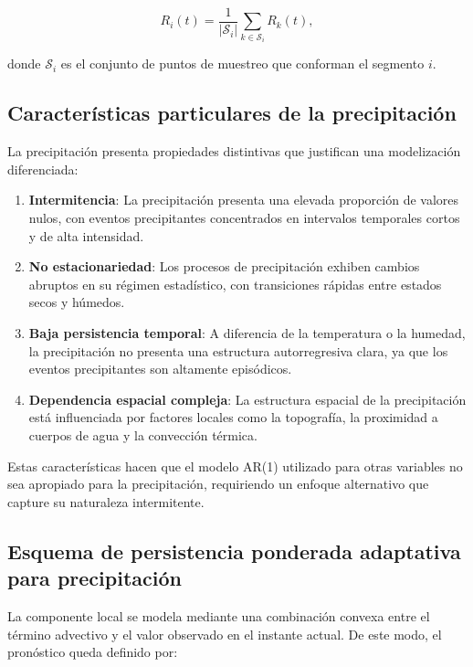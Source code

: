 \documentclass[
  spanish,
  us-letterpaper,
]{scrreprt}
\numberwithin{equation}{section}
\begin{document}
\[
R_i(t) = \frac{1}{|\mathcal{S}_i|} \sum_{k \in \mathcal{S}_i} R_k(t),
\]

donde \(\mathcal{S}_i\) es el conjunto de puntos de muestreo que
conforman el segmento \(i\).

\subsection{Características particulares de la
precipitación}\label{caracteruxedsticas-particulares-de-la-precipitaciuxf3n}

La precipitación presenta propiedades distintivas que justifican una
modelización diferenciada:

\begin{enumerate}
\def\labelenumi{\arabic{enumi}.}
\item
  \textbf{Intermitencia}: La precipitación presenta una elevada
  proporción de valores nulos, con eventos precipitantes concentrados en
  intervalos temporales cortos y de alta intensidad.
\item
  \textbf{No estacionariedad}: Los procesos de precipitación exhiben
  cambios abruptos en su régimen estadístico, con transiciones rápidas
  entre estados secos y húmedos.
\item
  \textbf{Baja persistencia temporal}: A diferencia de la temperatura o
  la humedad, la precipitación no presenta una estructura autorregresiva
  clara, ya que los eventos precipitantes son altamente episódicos.
\item
  \textbf{Dependencia espacial compleja}: La estructura espacial de la
  precipitación está influenciada por factores locales como la
  topografía, la proximidad a cuerpos de agua y la convección térmica.
\end{enumerate}

Estas características hacen que el modelo AR(1) utilizado para otras
variables no sea apropiado para la precipitación, requiriendo un enfoque
alternativo que capture su naturaleza intermitente.

\subsection{Esquema de persistencia ponderada adaptativa para
precipitación}\label{esquema-de-persistencia-ponderada-adaptativa-para-precipitaciuxf3n}

La componente local se modela mediante una combinación convexa entre el
término advectivo y el valor observado en el instante actual. De este
modo, el pronóstico queda definido por:
\end{document}
